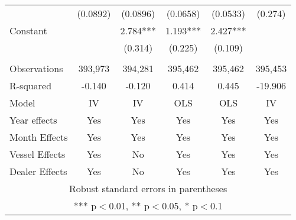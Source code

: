 \begin{tabular}{lccccc}
 & (0.0892) & (0.0896) & (0.0658) & (0.0533) & (0.274) \\
Constant &  & 2.784*** & 1.193*** & 2.427*** &  \\
 &  & (0.314) & (0.225) & (0.109) &  \\
 &  &  &  &  &  \\
Observations & 393,973 & 394,281 & 395,462 & 395,462 & 395,453 \\
R-squared & -0.140 & -0.120 & 0.414 & 0.445 & -19.906 \\
Model & IV & IV & OLS & OLS & IV \\
Year effects & Yes & Yes & Yes & Yes & Yes \\
Month Effects & Yes & Yes & Yes & Yes & Yes \\
Vessel Effects & Yes & No & Yes & Yes & Yes \\
 Dealer Effects & Yes & No & Yes & Yes & Yes \\ \hline
\multicolumn{6}{c}{ Robust standard errors in parentheses} \\
\multicolumn{6}{c}{ *** p$<$0.01, ** p$<$0.05, * p$<$0.1} \\
\end{tabular}
